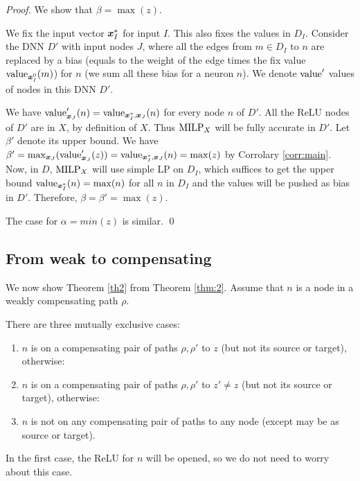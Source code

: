 			
\begin{proof}
	We show that $\beta=\max(z)$.

	We fix the input vector $\boldsymbol{x}^*_I$ for input $I$.
	This also fixes the values in $D_I$.
	Consider the DNN $D'$ with input nodes $J$, where all the 
	edges from $m \in D_I$ to $n$ are replaced by a bias (equals to the weight of the edge times the fix value ${\textrm{value}}_{\boldsymbol{x}^0_I}(m)$) for $n$ (we sum all these bias for a neuron $n$).
	We denote ${\textrm{value}}'$ values of nodes in this DNN $D'$.
		 
	We have ${\textrm{value}}'_{\boldsymbol{x}_J}(n)={\textrm{value}}_{\boldsymbol{x}^*_I,\boldsymbol{x}_J}(n)$ 
	for every node $n$ of $D'$. All the ReLU nodes of $D'$ are in $X$, by definition of $X$.
Thus ${\textrm{MILP}}_X$ will be fully accurate in $D'$. Let $\beta'$ denote its upper bound.
We have $\beta'=\max_{\boldsymbol{x}{_J}} ({\textrm{value}}'_{\boldsymbol{x}_{J}}(z)) = 
{\textrm{value}}_{\boldsymbol{x}^*_I,\boldsymbol{x}_J}(n) = \max(z)$ by Corrolary \ref{corr:main}.
Now, in $D$, ${\textrm{MILP}}_X$ will use simple LP on $D_I$, which suffices to get the upper bound ${\textrm{value}}_{\boldsymbol{x}^*_I}(n)=\max(n)$ for all $n$ in $D_I$ and the values will be pushed as bias in $D'$. Therefore, $\beta=\beta'=\max(z)$.

The case for $\alpha=min(z)$ is similar. \qed
	
\end{proof}
			
\subsection{From weak to compensating}
			
			We now show Theorem \ref{th2} from Theorem \ref{thm:2}.
			Assume that $n$ is a node in a weakly compensating path $\rho$.
			
			There are three mutually exclusive cases:
			\begin{enumerate}
				\item $n$ is on a compensating pair of paths $\rho,\rho'$ to $z$ (but not its source or target), otherwise:
				
				\item $n$ is on a compensating pair of paths $\rho,\rho'$ to $z' \neq z$ (but not its source or target), otherwise:
				
				\item $n$ is not on any compensating pair of paths to any node (except may be as source or target).
			\end{enumerate}

			In the first case, the ReLU for $n$ will be opened, so we do not need to worry about this case.
			
